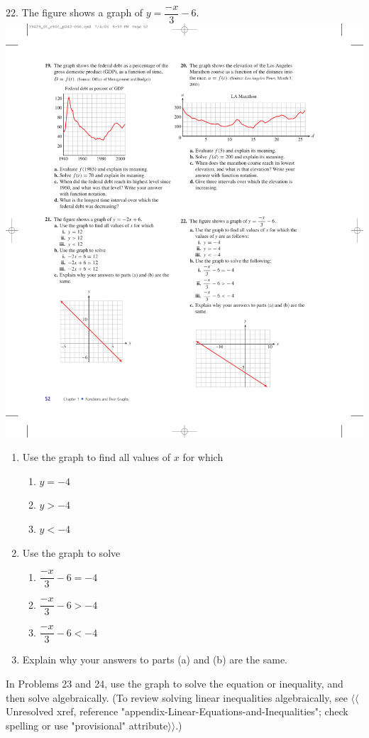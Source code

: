 \documentclass[10pt,]{book}
\theoremstyle{plain}
\theoremstyle{definition}
\theoremstyle{definition}
\theoremstyle{definition}
\theoremstyle{definition}
\numberwithin{equation}{part}
\newcommand{\lt}{<}
\newcommand{\gt}{>}
\begin{document}
\begin{exerciselist}
%
\item[22.]\hypertarget{exercise-179}{}The figure shows a graph of \(y =\dfrac{-x}{3} - 6\). \includegraphics[width=0.45\linewidth]{images/fig-ex-1-3-22}
 \leavevmode%
\begin{enumerate}[label=*\alph**]
\item\hypertarget{li-758}{}Use the graph to find all values of \(x\) for which %
\begin{enumerate}[label=*\roman**]
\item\hypertarget{li-759}{}\(y=-4\)%
\item\hypertarget{li-760}{}\(y\gt -4\)%
\item\hypertarget{li-761}{}\(y\lt -4\)%
\end{enumerate}
%
\item\hypertarget{li-762}{}Use the graph to solve %
\begin{enumerate}[label=*\roman**]
\item\hypertarget{li-763}{}\(\dfrac{-x}{3} - 6=-4\)%
\item\hypertarget{li-764}{}\(\dfrac{-x}{3} - 6\gt -4\)%
\item\hypertarget{li-765}{}\(\dfrac{-x}{3} - 6\lt -4\)%
\end{enumerate}
%
\item\hypertarget{li-766}{}Explain why your answers to parts (a) and (b) are the same.%
\end{enumerate}
%
\par\smallskip
\hypertarget{exercisegroup-19}{}\par\noindent In Problems 23 and 24, use the graph to solve the equation or inequality, and then solve algebraically. (To review solving linear inequalities algebraically, see {$\langle\langle$Unresolved xref, reference "appendix-Linear-Equations-and-Inequalities"; check spelling or use "provisional" attribute$\rangle\rangle$}.)%

\end{exerciselist}
\end{document}
